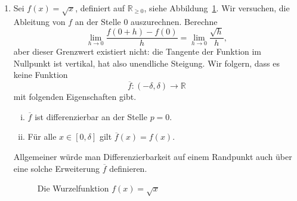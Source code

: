 \documentclass[../main.tex]{subfiles}
\begin{document}
\begin{examples}
  \leavevmode
  \begin{enumerate}[(1)]
    \item Sei $f(x) = \sqrt x$,
      definiert auf $\mathbb{R}_{\geq 0}$,
      siehe Abbildung~\ref{fig:sqrt}.
      Wir versuchen, die Ableitung
      von $f$ an der Stelle $0$ auszurechnen.
      Berechne
      \[
        \lim_{h \to 0} \frac{f(0 + h) - f(0)}{h}
        = \lim_{h \to 0} \frac{\sqrt h}{h},
      \]
      aber dieser Grenzwert existiert nicht: 
      die Tangente der Funktion im Nullpunkt
      ist vertikal, hat also unendliche Steigung.
      Wir folgern, dass es keine Funktion
      \[
      \overline f \colon (- \delta, \delta) \to \mathbb{R}
      \]
      mit folgenden Eigenschaften gibt.
      \begin{enumerate}[(i)]
        \item $\overline f$ ist differenzierbar
          an der Stelle $p = 0$.
        \item Für alle $x \in [0, \delta]$ gilt
          $\overline f (x) = f(x)$.
      \end{enumerate}
      Allgemeiner würde man Differenzierbarkeit auf
      einem Randpunkt auch über eine solche
      Erweiterung $\overline f$ definieren.
      
      \begin{figure}[htb]
        \centering
        
        \caption{Die Wurzelfunktion $f(x) = \sqrt x$}%
        \label{fig:sqrt}
      \end{figure}


\end{enumerate}
\end{examples}
\end{document}
